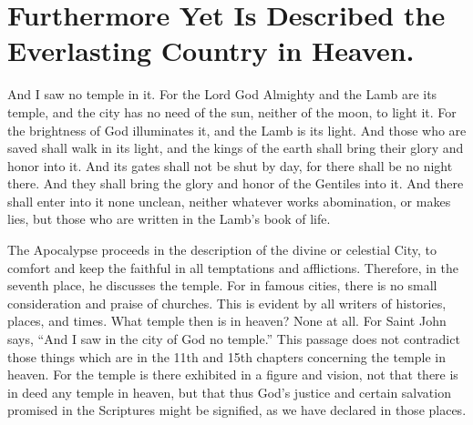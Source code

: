 \chapter[Sermon 95. Furthermore Yet Is Described the Everlasting Country in Heaven.]{Furthermore Yet Is Described the Everlasting Country in Heaven.}
\label{sermon:095}

And I saw no temple in it. For the Lord God Almighty and the Lamb are its temple, and the city has no need of the sun, neither of the moon, to light it. For the brightness of God illuminates it, and the Lamb is its light. And those who are saved shall walk in its light, and the kings of the earth shall bring their glory and honor into it. And its gates shall not be shut by day, for there shall be no night there. And they shall bring the glory and honor of the Gentiles into it. And there shall enter into it none unclean, neither whatever works abomination, or makes lies, but those who are written in the Lamb’s book of life.

The Apocalypse proceeds in the description of the divine or celestial City, to comfort and keep the faithful in all temptations and afflictions. Therefore, in the seventh place, he discusses the temple. For in famous cities, there is no small consideration and praise of churches. This is evident by all writers of histories, places, and times. What temple then is in heaven? None at all. For Saint John says, “And I saw in the city of God no temple.” This passage does not contradict those things which are in the 11th and 15th chapters concerning the temple in heaven. For the temple is there exhibited in a figure and vision, not that there is in deed any temple in heaven, but that thus God’s justice and certain salvation promised in the Scriptures might be signified, as we have declared in those places.

